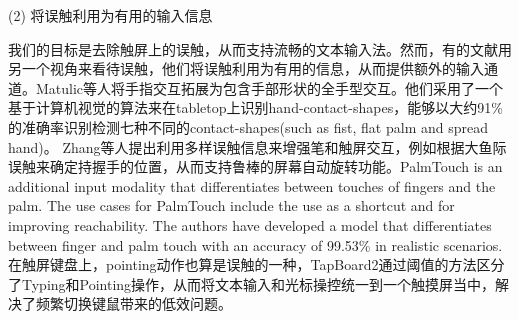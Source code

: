 


(2) 将误触利用为有用的输入信息

我们的目标是去除触屏上的误触，从而支持流畅的文本输入法。然而，有的文献用另一个视角来看待误触，他们将误触利用为有用的信息，从而提供额外的输入通道。Matulic等人\cite{2017-HandContact}将手指交互拓展为包含手部形状的全手型交互。他们采用了一个基于计算机视觉的算法来在tabletop上识别hand-contact-shapes，能够以大约91\%的准确率识别检测七种不同的contact-shapes(such as fist, flat palm and spread hand)。 Zhang等人\cite{2019-PenTouch}提出利用多样误触信息来增强笔和触屏交互，例如根据大鱼际误触来确定持握手的位置，从而支持鲁棒的屏幕自动旋转功能。PalmTouch is \cite{2018-PalmTouch} an additional input modality that differentiates between touches of fingers and the palm. The use cases for PalmTouch include the use as a shortcut and for improving reachability. The authors have developed a model that differentiates between finger and palm touch with an accuracy of 99.53\% in realistic scenarios. 在触屏键盘上，pointing动作也算是误触的一种，TapBoard2\cite{2016-TapBoard2}通过阈值的方法区分了Typing和Pointing操作，从而将文本输入和光标操控统一到一个触摸屏当中，解决了频繁切换键鼠带来的低效问题\cite{2006-TouchType}。
